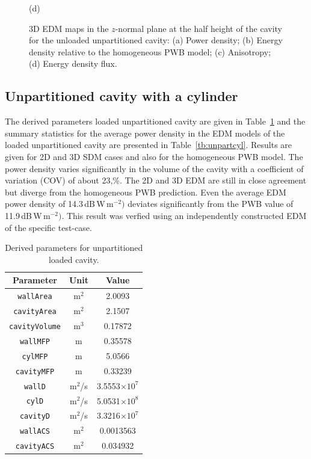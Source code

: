 \documentclass[a4paper]{article}
\numberwithin{equation}{section}
\newcounter{Table}
\begin{document}
\begin{figure}[ht]
\begin{center}
{\footnotesize (d)}\\
\vspace{-2mm}
\caption{\label{fg:unpartempty_maps} 3D EDM maps in the $z$-normal plane at the half height of the cavity for the 
unloaded unpartitioned cavity: (a) Power density; (b) Energy density relative to the homogeneous PWB model;
(c) Anisotropy; (d) Energy density flux.}
\end{center}
\end{figure}

\subsection[Unpartitioned cavity with a cylinder]{Unpartitioned cavity with a cylinder}
\label{sc:res:unpartcyl}

The derived parameters loaded unpartitioned cavity are given in Table~\ref{tb:derivparamsl} and the 
summary statistics for the average power density in the EDM models of the loaded unpartitioned cavity
are presented in Table~\ref{tb:unpartcyl}. Results are given for 2D and 3D SDM cases and also for the 
homogeneous PWB model. The power density varies significantly in the volume of the cavity with a coefficient 
of variation (COV) of about 23,\%. The 2D and 3D EDM are still in close agreement but diverge from the homogeneous
PWB prediction. Even the average EDM power density of 14.3\,dB\,W\,m$^{-2})$ deviates significantly from the PWB value
of 11.9\,dB\,W\,m$^{-2})$. This result was verfied using an independently constructed EDM of the specific test-case. 

\begin{table}[ht]
\begin{center}
\begin{tabular}{|c|c|c|}
\hline
\textbf{Parameter}     &\textbf{Unit} &\textbf{Value}\\ 
\hline
\texttt{wallArea}      &m$^2$         &2.0093              \\
\texttt{cavityArea}    &m$^2$         &2.1507              \\
\texttt{cavityVolume}  &m$^3$         &0.17872             \\
\texttt{wallMFP}       &m             &0.35578             \\
\texttt{cylMFP}        &m             &5.0566              \\
\texttt{cavityMFP}     &m             &0.33239             \\
\texttt{wallD}         &m$^2$/s       &3.5553$\times 10^7$ \\
\texttt{cylD}          &m$^2$/s       &5.0531$\times 10^8$ \\
\texttt{cavityD}       &m$^2$/s       &3.3216$\times 10^7$ \\
\texttt{wallACS}       &m$^2$         &0.0013563           \\
\texttt{cavityACS}     &m$^2$         &0.034932            \\
\hline
\end{tabular}
\end{center}
\caption{\label{tb:derivparamsl} Derived parameters for unpartitioned loaded cavity.}
\end{table}
\end{document}
